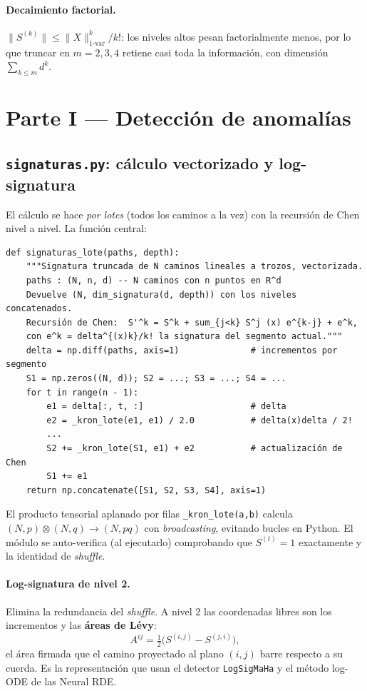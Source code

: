 \documentclass[11pt,a4paper]{article}
\begin{document}
\paragraph{Decaimiento factorial.}
$\lVert S^{(k)}\rVert \le \lVert X\rVert_{1\text{-var}}^k / k!$: los niveles
altos pesan factorialmente menos, por lo que truncar en $m=2,3,4$ retiene casi
toda la información, con dimensión $\sum_{k\le m} d^k$.

\newpage
\section{Parte I — Detección de anomalías}

\subsection{\texttt{signaturas.py}: cálculo vectorizado y log-signatura}

El cálculo se hace \emph{por lotes} (todos los caminos a la vez) con la
recursión de Chen nivel a nivel. La función central:

\begin{lstlisting}
def signaturas_lote(paths, depth):
    """Signatura truncada de N caminos lineales a trozos, vectorizada.
    paths : (N, n, d) -- N caminos con n puntos en R^d
    Devuelve (N, dim_signatura(d, depth)) con los niveles concatenados.
    Recursión de Chen:  S'^k = S^k + sum_{j<k} S^j (x) e^{k-j} + e^k,
    con e^k = delta^{(x)k}/k! la signatura del segmento actual."""
    delta = np.diff(paths, axis=1)              # incrementos por segmento
    S1 = np.zeros((N, d)); S2 = ...; S3 = ...; S4 = ...
    for t in range(n - 1):
        e1 = delta[:, t, :]                     # delta
        e2 = _kron_lote(e1, e1) / 2.0           # delta(x)delta / 2!
        ...
        S2 += _kron_lote(S1, e1) + e2           # actualización de Chen
        S1 += e1
    return np.concatenate([S1, S2, S3, S4], axis=1)
\end{lstlisting}

\noindent El producto tensorial aplanado por filas \texttt{\_kron\_lote(a,b)}
calcula $(N,p)\otimes(N,q)\to(N,pq)$ con \emph{broadcasting}, evitando bucles
en Python. El módulo se auto-verifica (al ejecutarlo) comprobando que
$S^{(t)}=1$ exactamente y la identidad de \emph{shuffle}.

\paragraph{Log-signatura de nivel 2.} Elimina la redundancia del \emph{shuffle}.
A nivel 2 las coordenadas libres son los incrementos y las \textbf{áreas de
Lévy}:
\[
A^{ij} = \tfrac12\big(S^{(i,j)} - S^{(j,i)}\big),
\]
el área firmada que el camino proyectado al plano $(i,j)$ barre respecto a su
cuerda. Es la representación que usan el detector \texttt{LogSigMaHa} y el
método log-ODE de las Neural RDE.
\end{document}
